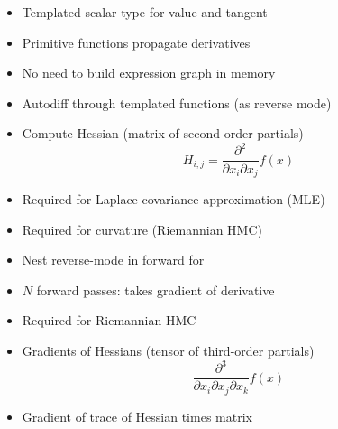 \documentclass[10pt]{report}
\begin{document}
%
\begin{itemize}
\item Templated scalar type for value and tangent
\item Primitive functions propagate derivatives
\item No need to build expression graph in memory
\item Autodiff through templated functions (as reverse mode)
\end{itemize}

%
\begin{itemize}
\item Compute Hessian (matrix of second-order partials)
\[
H_{i,j} = \frac{\partial^2}{\partial x_i \partial x_j} f(x)
\]
\item Required for Laplace covariance approximation (MLE)
\item Required for curvature (Riemannian HMC)
\item Nest reverse-mode in forward for 
\item $N$ forward passes: takes gradient of derivative
\end{itemize}


%
\begin{itemize}
\item Required for Riemannian HMC
\item Gradients of Hessians (tensor of third-order partials)
\[
\frac{\partial^3}{\partial x_i \partial x_j \partial x_k} f(x)
\]
\vspace*{-12pt}
\end{itemize}


%
\begin{itemize}
\item Gradient of trace of Hessian times matrix
\end{itemize}
\end{document}
